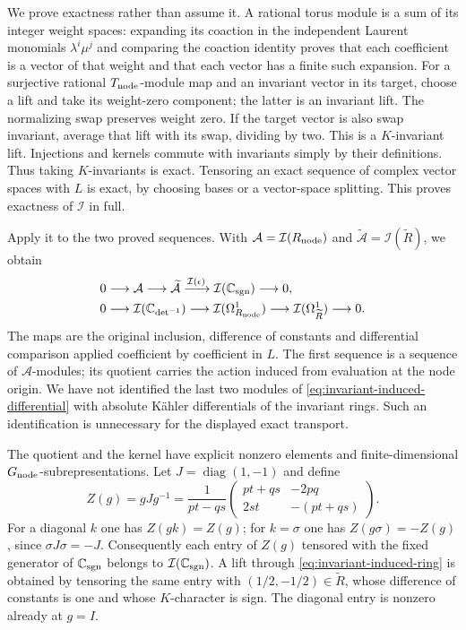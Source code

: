 We prove exactness rather than assume it. A rational torus module
is a sum of its integer weight spaces: expanding its coaction in the
independent Laurent monomials $\lambda^i\mu^j$ and comparing the
coaction identity proves that each coefficient is a vector of that
weight and that each vector has a finite such expansion. For a
surjective rational $T_{\rm node}$-module map and an invariant vector
in its target, choose a lift and take its weight-zero component;
the latter is an invariant lift. The normalizing swap preserves
weight zero. If the target vector is also swap invariant, average
that lift with its swap, dividing by two. This is a $K$-invariant
lift. Injections and kernels commute with invariants simply by
their definitions. Thus taking $K$-invariants is exact. Tensoring
an exact sequence of complex vector spaces with $L$ is exact, by
choosing bases or a vector-space splitting. This proves exactness
of $\mathcal I$ in full.

Apply it to the two proved sequences. With
$\mathcal A=\mathcal I(R_{\rm node})$ and
$\widetilde{\mathcal A}=\mathcal I(\widetilde R)$, we obtain
\begin{align}
 0&\longrightarrow\mathcal A\longrightarrow
 \widetilde{\mathcal A}\xrightarrow{\mathcal I(\epsilon)}
 \mathcal I(\mathbb C_{\rm sgn})\longrightarrow0,
 \label{eq:invariant-induced-ring}\\
 0&\longrightarrow\mathcal I(\mathbb C_{\det^{-1}})
 \longrightarrow\mathcal I(\Omega^1_{R_{\rm node}})
 \longrightarrow\mathcal I(\Omega^1_{\widetilde R})
 \longrightarrow0.
 \label{eq:invariant-induced-differential}
\end{align}
The maps are the original inclusion, difference of constants and
differential comparison applied coefficient by coefficient in $L$.
The first sequence is a sequence of $\mathcal A$-modules; its
quotient carries the action induced from evaluation at the node
origin. We have not identified the last two modules of
\eqref{eq:invariant-induced-differential} with absolute K\"ahler
differentials of the invariant rings. Such an identification is
unnecessary for the displayed exact transport.

The quotient and the kernel have explicit nonzero elements and
finite-dimensional $G_{\rm node}$-subrepresentations. Let
$J=\operatorname{diag}(1,-1)$ and define
\begin{equation}\label{eq:invariant-adjoint}
 Z(g)=gJg^{-1}
 =\frac1{pt-qs}
 \begin{pmatrix}pt+qs&-2pq\\2st&-(pt+qs)\end{pmatrix}.
\end{equation}
For a diagonal $k$ one has $Z(gk)=Z(g)$; for $k=\sigma$ one has
$Z(g\sigma)=-Z(g)$, since $\sigma J\sigma=-J$.
Consequently each entry of $Z(g)$ tensored with the fixed generator
of $\mathbb C_{\rm sgn}$ belongs to
$\mathcal I(\mathbb C_{\rm sgn})$. A lift through
\eqref{eq:invariant-induced-ring} is obtained by tensoring the same
entry with $(1/2,-1/2)\in\widetilde R$, whose difference of constants
is one and whose $K$-character is sign. The diagonal entry is nonzero
already at $g=I$.

